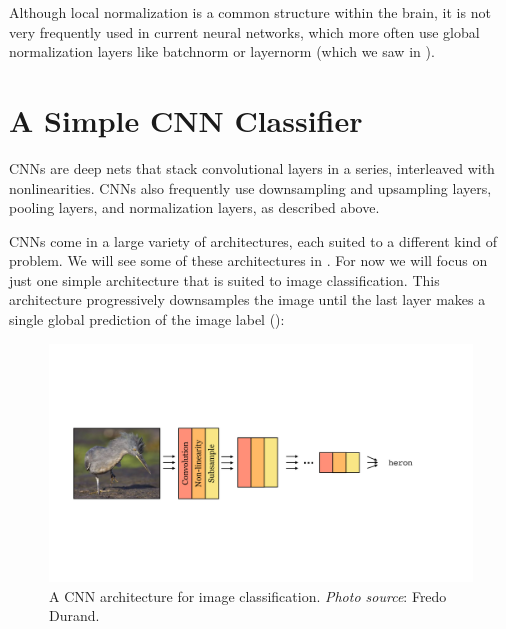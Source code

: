 Although local normalization is a common structure within the brain, it is not very frequently used in current neural networks, which more often use global normalization layers like batchnorm or layernorm (which we saw in \chap{\ref{chapter:neural_nets}}).


\section{A Simple CNN Classifier}
\label{sec:convolutional_neural_nets:simple_CNN}

CNNs are deep nets that stack convolutional layers in a series, interleaved with nonlinearities. CNNs also frequently use downsampling and upsampling layers, pooling layers, and normalization layers, as described above.

CNNs come in a large variety of architectures, each suited to a different kind of problem. We will see some of these architectures in \sect{\ref{sec:convolutional_neural_nets:popular_architectures}}. For now we will focus on just one simple architecture that is suited to image classification. This architecture progressively downsamples the image until the last layer makes a single global prediction of the image label (\fig{\ref{fig:convolutional_neural_nets:convnet_motif}}):
\begin{figure}[h]
    \centerline{
        \includegraphics[width=1.0\linewidth]{./figures/convolutional_neural_nets/convnet_motif.pdf}}
    \caption{A CNN architecture for image classification. {\em Photo source}: Fredo Durand.}
    \label{fig:convolutional_neural_nets:convnet_motif}
\end{figure}

